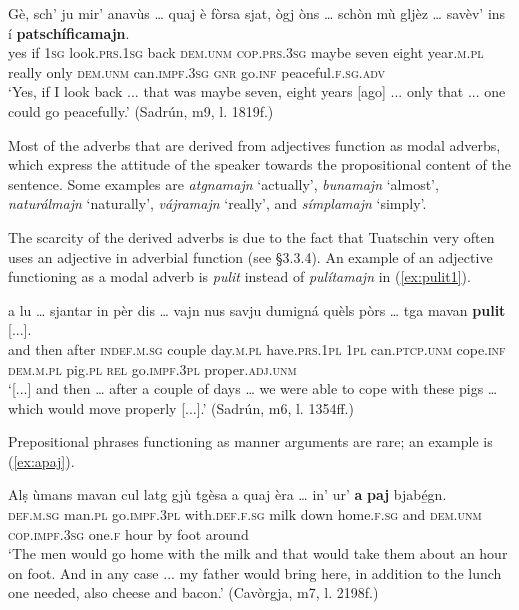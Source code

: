 \ea
\label{ex:majn2}
\gll Gè, sch’ ju mir’ anavùs … quaj è fòrsa sjat, ògj òns … schòn mù gljèz … savèv’ ins í \textbf{patschíficamajn}.   \\
yes if \textsc{1sg} look.\textsc{prs.1sg} back {} \textsc{dem.unm} \textsc{cop.prs.3sg} maybe seven eight year.\textsc{m.pl} {} really only \textsc{dem.unm} {} can.\textsc{impf.3sg} \textsc{gnr} go.\textsc{inf} peaceful.\textsc{f.sg.adv}\\
\glt `Yes, if I look back ... that was maybe seven, eight years [ago] ... only that ... one could go peacefully.' (Sadrún, m9, l. 1819f.)
\z

Most of the adverbs that are derived from adjectives function as modal adverbs, which express the attitude of the speaker towards the propositional content of the sentence. Some examples are \textit{atgnamajn} `actually', \textit{bunamajn} `almost', \textit{naturálmajn} `naturally', \textit{vájramajn} `really', and \textit{símplamajn} `simply'.

The scarcity of the derived adverbs is due to the fact that Tuatschin very often uses an adjective in adverbial function (see §3.3.4). An example of an adjective functioning as a modal adverb is \textit{pulit} instead of \textit{pulítamajn} in (\ref{ex:pulit1}).

\ea
\label{ex:pulit1}
\gll [...] a lu … sjantar in pèr dis … vajn nus savju dumigná quèls pòrs … tga mavan \textbf{pulit} [...].\\
{} and then {} after \textsc{indef.m.sg} couple day.\textsc{m.pl} {} have.\textsc{prs.1pl} \textsc{1pl} can.\textsc{ptcp.unm} cope.\textsc{inf} \textsc{dem.m.pl} pig.\textsc{pl} {} \textsc{rel}  go.\textsc{impf.3pl} proper.\textsc{adj.unm} \\
\glt `[...] and then … after a couple of days … we were able to cope with these pigs … which would move properly [...].' (Sadrún, m6, l. 1354ff.)
\z

Prepositional phrases functioning as manner arguments are rare; an example is (\ref{ex:apaj}).

\ea
\label{ex:apaj}
\gll Alṣ ùmans mavan cul latg gjù tgèsa a quaj èra … in' ur’ \textbf{a} \textbf{paj} bjabé̱gn.\\
\textsc{def.m.sg} man.\textsc{pl} go.\textsc{impf.3pl} with.\textsc{def.f.sg} milk down home.\textsc{f.sg} and \textsc{dem.unm} \textsc{cop.impf.3sg} {} one.\textsc{f} hour by foot around\\
\glt `The men would go home with the milk and that would take them about an hour on foot. And in any case ... my father would bring here, in addition to the lunch one needed, also cheese and bacon.' (Cavòrgja, m7, l. 2198f.)
\z

